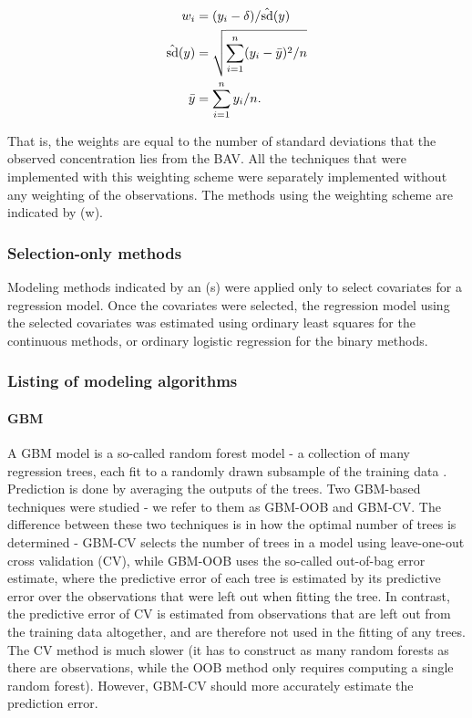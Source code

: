 \documentclass[authoryear,review, 12pt]{elsarticle}
\begin{document}
\[
    \begin{aligned}
        w_i &= (y_i - \delta) / \hat{\rm{sd}}(y)\\
        \hat{\rm{sd}}(y) &= \sqrt{\sum_{i=1}^n (y_i - \bar{y})^2 / n}\\
        \bar{y} &= \sum_{i=1}^n y_i / n.
    \end{aligned}
\]

That is, the weights are equal to the number of standard deviations that
the observed concentration lies from the BAV. All the techniques that
were implemented with this weighting scheme were separately implemented
without any weighting of the observations. The methods using the
weighting scheme are indicated by (w).

\subsubsection{Selection-only methods}\label{selection-only-methods}

Modeling methods indicated by an (s) were applied only to select
covariates for a regression model. Once the covariates were selected,
the regression model using the selected covariates was estimated using
ordinary least squares for the continuous methods, or ordinary logistic
regression for the binary methods.

\subsubsection{Listing of modeling
algorithms}\label{listing-of-modeling-algorithms}

\paragraph{GBM}\label{gbm}

A GBM model is a so-called random forest model - a collection of many
regression trees, each fit to a randomly drawn subsample of the training
data \citep{Friedman-2001}. Prediction is done by averaging the outputs
of the trees. Two GBM-based techniques were studied - we refer to them
as GBM-OOB and GBM-CV. The difference between these two techniques is in
how the optimal number of trees is determined - GBM-CV selects the
number of trees in a model using leave-one-out cross validation (CV),
while GBM-OOB uses the so-called out-of-bag error estimate, where the
predictive error of each tree is estimated by its predictive error over
the observations that were left out when fitting the tree. In contrast,
the predictive error of CV is estimated from observations that are left
out from the training data altogether, and are therefore not used in the
fitting of any trees. The CV method is much slower (it has to construct
as many random forests as there are observations, while the OOB method
only requires computing a single random forest). However, GBM-CV should
more accurately estimate the prediction error.
\end{document}
